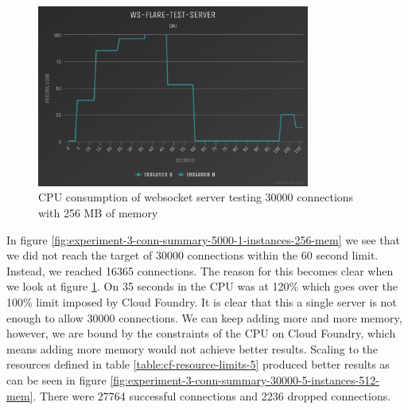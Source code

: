 \begin{figure}[H]
  \centering
    \includegraphics[width=0.8\textwidth]{figures/experiments/experiment-1/node-js/cpu-30000-256-memory.png}
    \caption{CPU consumption of websocket server testing 30000 connections with 256 MB of memory}
    \label{fig:experiment-3-cpu-5000-1-instances-256-mem}
\end{figure}

In figure \ref{fig:experiment-3-conn-summary-5000-1-instances-256-mem} we see that we did not reach the target of 30000 connections within the 60 second limit. Instead, we reached 16365 connections. The reason for this becomes clear when we look at figure  \ref{fig:experiment-3-cpu-5000-1-instances-256-mem}. On 35 seconds in the CPU was at 120\% which goes over the 100\% limit imposed by Cloud Foundry. It is clear that this a single server is not enough to allow 30000 connections. We can keep adding more and more memory, however, we are bound by the constraints of the CPU on Cloud Foundry, which means adding more memory would not achieve better results. Scaling to the resources defined in table \ref{table:cf-resource-limits-5} produced better results as can be seen in figure \ref{fig:experiment-3-conn-summary-30000-5-instances-512-mem}. There were 27764 successful connections and 2236 dropped connections.

\begin{table}[H]
\caption{Cloud Foundry Resource Limits}
\label{table:cf-resource-limits-5}
\end{table}


